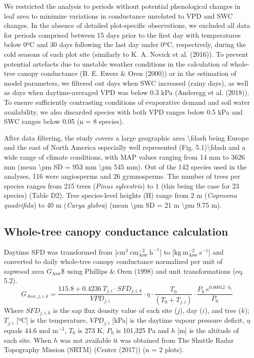 \documentclass[11pt,twoside]{reedthesis}
\begin{document}
We restricted the analysis to periods without potential phenological
changes in leaf area to minimize variations in conductance unrelated to
VPD and SWC changes. In the absence of detailed plot-specific
observations, we excluded all data for periods comprised between 15 days
prior to the first day with temperatures below 0ºC and 30 days following
the last day under 0ºC, respectively, during the cold seasons of each
plot site (similarly to K. A. Novick et al. (2016)). To prevent
potential artefacts due to unstable weather conditions in the
calculation of whole-tree canopy conductance (B. E. Ewers \& Oren
(2000)) or in the estimation of model parameters, we filtered out days
when SWC increased (rainy days), as well as days when daytime-averaged
VPD was below 0.3 kPa (Anderegg et al. (2018)). To ensure sufficiently
contrasting conditions of evaporative demand and soil water
availability, we also discarded species with both VPD ranges below 0.5
kPa and SWC ranges below 0.05 (n = 8 species).\par

After data filtering, the study covers a large geographic area
\textbackslash{}fdash being Europe and the east of North America
especially well represented (Fig. 5.1)\textbackslash{}fdash and a wide
range of climate conditions, with MAP values ranging from 14 mm to 3626
mm (mean \textbackslash{}pm SD = 953 mm \textbackslash{}pm 545 mm). Out
of the 142 species used in the analyses, 116 were angiosperms and 26
gymnosperms. The number of trees per species ranges from 215 trees
(\emph{Pinus sylvestris}) to 1 (this being the case for 23 species)
(Table D2). Tree species-level heights (H) range from 2 m
(\emph{Coprosma quadrifida}) to 40 m (\emph{Carya glabra}) (mean
\textbackslash{}pm SD = 21 m \textbackslash{}pm 9.75 m).\par

\subsection{Whole-tree canopy conductance
calculation}\label{whole-tree-canopy-conductance-calculation}

Daytime SFD was transformed from
{[}\(\text{cm}^3 \: \text{cm}_{\text{Asw}}^{-2} \: \text{h}^{-1}\){]} to
{[}\(\text{kg} \: \text{m}_{\text{Asw}}^{-2} \: \text{s}^{-1}\){]} and
converted to daily whole-tree canopy conductance normalized per unit of
sapwood area \(G_{\text{Asw}}\)\$ using Phillips \& Oren (1998) and unit
transformations (eq. 5.2).
\begin{equation}
G_{Asw,j,i,k} = \frac{115.8 + 0.4236 \: T_{j , i} \cdot SFD_{j , i , k}}{VPD_{j,i}}\cdot \eta \cdot \frac{T_0}{(T_0 + T_{j,i})} \cdot \frac{P_0 \: e^{0.00012 \cdot h_i}}{P_0}
\end{equation}
Where \(SFD_{j,i,k}\) is the sap flux density value of each site
(\(j\)), day (\(i\)), and tree (\(k\)); \({T}_{j,i}\) {[}ºC{]} is the
temperature, \(VPD_{j,i}\) {[}kPa{]} is the daytime vapour pressure
deficit, \(\eta\) equals 44.6 mol \(\text{m}^{-3}\), \(T_0\) is 273 K,
\(P_0\) is 101,325 Pa and \(h\) {[}m{]} is the altitude of each site.
When \(h\) was not available it was obtained from The Shuttle Radar
Topography Mission (SRTM) (Center (2017)) (n = 2 plots).\par
\end{document}
